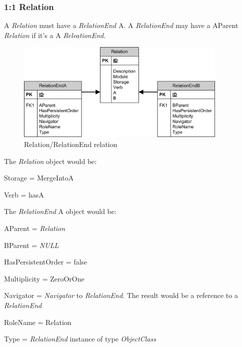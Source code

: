 \subsubsection{1:1 Relation}
A \emph{Relation} must have a \emph{RelationEnd} A. A \emph{RelationEnd} may have a AParent \emph{Relation} if it's a A \emph{ReleationEnd}.

\begin{figure}[ht]
	\begin{center}
		\includegraphics[width=0.9\textwidth]{images/Rel_Attributes.png}
		\caption{Relation/RelationEnd relation}
		\label{relation_relationend_relation}
	\end{center}
\end{figure}

The \emph{Relation} object would be:
\begin{descriptionBorder}
	\item[Storage] 		{ = MergeIntoA }
	\item[Verb] 		{ = hasA }
\end{descriptionBorder}

The \emph{RelationEnd} A object would be:
\begin{descriptionBorder}
	\item[AParent] { = \emph{Relation}  }
	\item[BParent] { = \emph{NULL} }
	\item[HasPersistentOrder] { = false  }
	\item[Multiplicity] { = ZeroOrOne }
	\item[Navigator] { = \emph{Navigator} to \emph{RelationEnd}. The result would be a reference to a \emph{RelationEnd} }
	\item[RoleName] { = Relation }
	\item[Type] { = \emph{RelationEnd} instance of type \emph{ObjectClass} }
\end{descriptionBorder}

